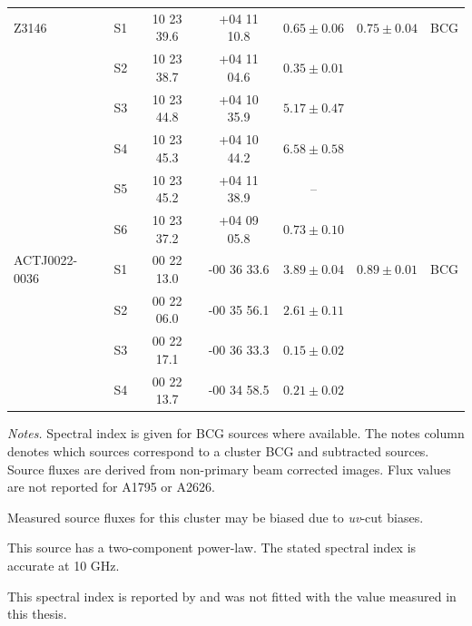 \begin{table}
\begin{threeparttable}
\begin{tabular}{lcccccc}
                Z3146\tnote{*}           & S1            & 10 23 39.6        & +04 11 10.8           & $0.65\pm0.06$              & $0.75\pm0.04$ & BCG \\
                                & S2            & 10 23 38.7        & +04 11 04.6           & $0.35\pm0.01$              &  & \\
                                & S3            & 10 23 44.8        & +04 10 35.9           & $5.17\pm0.47$              &  & \\
                                & S4            & 10 23 45.3        & +04 10 44.2           & $6.58\pm0.58$              &  & \\
                                & S5            & 10 23 45.2        & +04 11 38.9           & --                         &  & \\
                                & S6            & 10 23 37.2        & +04 09 05.8           & $0.73\pm0.10$              &  & \\
                \addlinespace[0.5em]
                
                ACTJ0022-0036\tnote{*}   & S1            & 00 22 13.0        & -00 36 33.6           & $3.89\pm0.04$              & $0.89\pm0.01$ & BCG \\
                                & S2            & 00 22 06.0        & -00 35 56.1           & $2.61\pm0.11$              &  & \\
                                & S3            & 00 22 17.1        & -00 36 33.3           & $0.15\pm0.02$              &  & \\
                                & S4            & 00 22 13.7        & -00 34 58.5           & $0.21\pm0.02$              &  & \\
                \bottomrule
            \end{tabular}
            \begin{tablenotes}[flushleft]
                    \footnotesize
                    \item \textit{Notes.} Spectral index is given for BCG sources where available. The notes column denotes which sources correspond to a cluster BCG and subtracted sources. Source fluxes are derived from non-primary beam corrected images. Flux values are not reported for A1795 or A2626.
                    \item[*] Measured source fluxes for this cluster may be biased due to \textit{uv}-cut biases.
                    \item[**] This source has a two-component power-law. The stated spectral index is accurate at 10 GHz.
                    \item[\Cross] This spectral index is reported by \citet{Riseley2023} and was not fitted with the value measured in this thesis. 
                \end{tablenotes}
        \end{threeparttable}

    \endgroup{}
\end{table}
